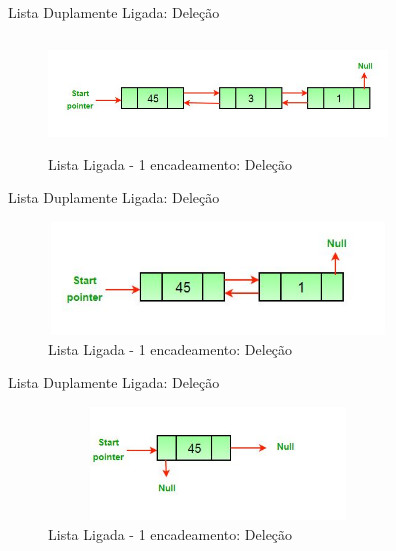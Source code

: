 \begin{frame}
	\begin{block}{Lista Duplamente Ligada: Deleção}
		\begin{figure}[!htb]
			\centering	  				
			\includegraphics[height=3cm, width = 9cm]{./pic/Delete_lincked_list2.jpg}
			\caption{Lista Ligada - 1 encadeamento: Deleção \cite{GEEKS_2018}}
			\label{fig_LDE_end}
		\end{figure}
	\end{block}
\end{frame}


\begin{frame}
	\begin{block}{Lista Duplamente Ligada: Deleção}
		\begin{figure}[!htb]
			\centering	  				
			\includegraphics[height=3cm, width = 9cm]{./pic/Delete_lincked_list3.jpg}
			\caption{Lista Ligada - 1 encadeamento: Deleção \cite{GEEKS_2018}}
			\label{fig_LDE_end}
		\end{figure}
	\end{block}
\end{frame}

\begin{frame}
	\begin{block}{Lista Duplamente Ligada: Deleção}
		\begin{figure}[!htb]
			\centering	  				
			\includegraphics[height=3cm, width = 9cm]{./pic/Delete_lincked_list4.jpg}
			\caption{Lista Ligada - 1 encadeamento: Deleção \cite{GEEKS_2018}}
			\label{fig_LDE_end}
		\end{figure}
	\end{block}
\end{frame}

